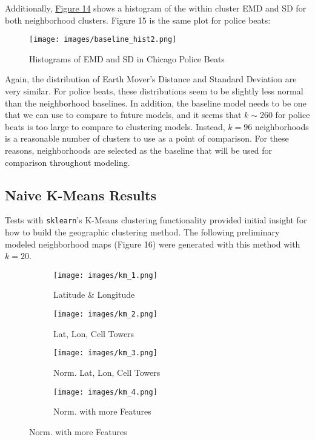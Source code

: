 \documentclass[times new roman,12pt]{article}
\begin{document}
Additionally, \hyperref[fig9]{Figure 14} shows a histogram of the within cluster EMD and SD for both neighborhood clusters. Figure 15 is the same plot for police beats: 

\begin{figure}[H]
\label{fig10}
\centering
  \texttt{[image: images/baseline\_hist2.png]}
  \caption{Histograms of EMD and SD in Chicago Police Beats}
  \label{fig:baseline_hist2}
\end{figure}

Again, the distribution of Earth Mover's Distance and Standard Deviation are very similar. For police beats, these distributions seem to be slightly less normal than the neighborhood baselines. In addition, the baseline model needs to be one that we can use to compare to future models, and it seems that $k \sim$260 for police beats is too large to compare to clustering models. Instead, $k=96$ neighborhoods is a reasonable number of clusters to use as a point of comparison. For these reasons, neighborhoods are selected as the baseline that will be used for comparison throughout modeling. 

\subsection{Naive K-Means Results}

Tests with \texttt{sklearn}'s K-Means clustering functionality provided initial insight for how to build the geographic clustering method. The following preliminary modeled neighborhood maps (Figure 16) were generated with this method with $k=20$. 

\begin{figure}[H]
    \centering
    \caption[Results of Naive K-Means Trials on Multiple Subsets of Data]
    {\small Results of Naive K-Means Trials on Multiple Subsets of Data}
    \begin{subfigure}[b]{0.345\textwidth}
        \centering
        \texttt{[image: images/km\_1.png]}
        \caption[Latitude \& Longitude]%
        {{\small Latitude \& Longitude}}    
        \label{fig:km_1}
    \end{subfigure}
    \quad
    \begin{subfigure}[b]{0.345\textwidth}  
        \centering 
        \texttt{[image: images/km\_2.png]}
        \caption[]%
        {{\small Lat, Lon, Cell Towers}}    
        \label{fig:km_2}
    \end{subfigure}
    \begin{subfigure}[b]{0.345\textwidth}   
        \centering 
        \texttt{[image: images/km\_3.png]}
        \caption[]%
        {{\small Norm. Lat, Lon, Cell Towers}}    
        \label{fig:km_3}
    \end{subfigure}
    \quad
    \begin{subfigure}[b]{0.345\textwidth}   
        \centering 
        \texttt{[image: images/km\_4.png]}
        \caption[]%
        {{\small Norm. with more Features}}    
        \label{fig:km_4}
    \end{subfigure}
    \label{fig:mean and std of nets}
\end{figure}
\end{document}
